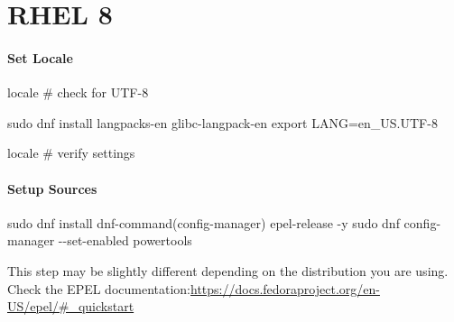 \documentclass[
  letterpaper,
  DIV=11,
  numbers=noendperiod]{scrreprt}
\newenvironment{Shaded}{\begin{snugshade}}{\end{snugshade}}
\newcommand{\AttributeTok}[1]{\textcolor[rgb]{0.40,0.45,0.13}{#1}}
\newcommand{\BuiltInTok}[1]{\textcolor[rgb]{0.00,0.23,0.31}{#1}}
\newcommand{\CommentTok}[1]{\textcolor[rgb]{0.37,0.37,0.37}{#1}}
\newcommand{\ExtensionTok}[1]{\textcolor[rgb]{0.00,0.23,0.31}{#1}}
\newcommand{\FunctionTok}[1]{\textcolor[rgb]{0.28,0.35,0.67}{#1}}
\newcommand{\NormalTok}[1]{\textcolor[rgb]{0.00,0.23,0.31}{#1}}
\newcommand{\OperatorTok}[1]{\textcolor[rgb]{0.37,0.37,0.37}{#1}}
\newcommand{\StringTok}[1]{\textcolor[rgb]{0.13,0.47,0.30}{#1}}
\newcommand{\VariableTok}[1]{\textcolor[rgb]{0.07,0.07,0.07}{#1}}
\begin{document}

\hypertarget{sec-rhel-8}{%
\chapter{RHEL 8}\label{sec-rhel-8}}

\hypertarget{set-locale-1}{%
\subsubsection{Set Locale}\label{set-locale-1}}

\begin{Shaded}
\begin{Highlighting}[]
\ExtensionTok{locale}  \CommentTok{\# check for UTF{-}8}

\FunctionTok{sudo}\NormalTok{ dnf install langpacks{-}en glibc{-}langpack{-}en}
\BuiltInTok{export} \VariableTok{LANG}\OperatorTok{=}\NormalTok{en\_US.UTF{-}8}

\ExtensionTok{locale}  \CommentTok{\# verify settings}
\end{Highlighting}
\end{Shaded}

\hypertarget{setup-sources-1}{%
\subsubsection{Setup Sources}\label{setup-sources-1}}

\begin{Shaded}
\begin{Highlighting}[]
\FunctionTok{sudo}\NormalTok{ dnf install }\StringTok{\textquotesingle{}dnf{-}command(config{-}manager)\textquotesingle{}}\NormalTok{ epel{-}release }\AttributeTok{{-}y}
\FunctionTok{sudo}\NormalTok{ dnf config{-}manager }\AttributeTok{{-}{-}set{-}enabled}\NormalTok{ powertools}
\end{Highlighting}
\end{Shaded}

\begin{tcolorbox}[enhanced jigsaw, titlerule=0mm, opacitybacktitle=0.6, colback=white, colbacktitle=quarto-callout-note-color!10!white, breakable, arc=.35mm, rightrule=.15mm, left=2mm, toprule=.15mm, colframe=quarto-callout-note-color-frame, bottomrule=.15mm, coltitle=black, opacityback=0, toptitle=1mm, title=\textcolor{quarto-callout-note-color}{\faInfo}\hspace{0.5em}{Note}, leftrule=.75mm, bottomtitle=1mm]

This step may be slightly different depending on the distribution you
are using. Check the EPEL
documentation:\url{https://docs.fedoraproject.org/en-US/epel/\#_quickstart}

\end{tcolorbox}
\end{document}
